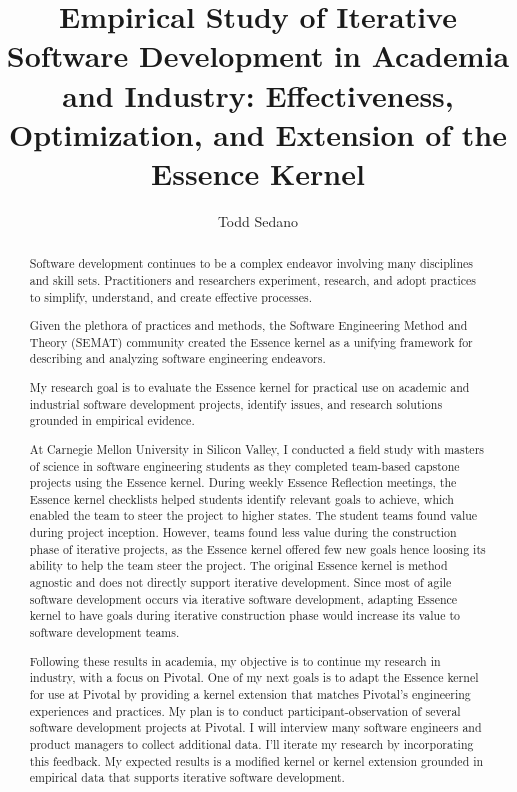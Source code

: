 \documentclass[preprint,12pt,3p]{elsarticle}
\begin{document}
\begin{frontmatter}

\title{Empirical Study of Iterative Software Development in Academia and Industry: Effectiveness, Optimization, and Extension of the Essence Kernel}

\author{Todd Sedano}


\address{Carnegie Mellon University}
\address{Silicon Valley Campus}
\address{Moffett Field, CA 94035, USA}


\begin{abstract}
Software development continues to be a complex endeavor involving many disciplines and skill sets. Practitioners and researchers experiment, research, and adopt practices to simplify, understand, and create effective processes. 

Given the plethora of practices and methods, the Software Engineering Method and Theory (SEMAT) community created the Essence kernel as a unifying framework for describing and analyzing software engineering endeavors. 

My research goal is to evaluate the Essence kernel for practical use on academic and industrial software development projects, identify issues, and research solutions grounded in empirical evidence. 

At Carnegie Mellon University in Silicon Valley, I conducted a field study with masters of science in software engineering students as they completed team-based capstone projects using the Essence kernel. During weekly Essence Reflection meetings, the Essence kernel checklists helped students identify relevant goals to achieve, which enabled the team to steer the project to higher states. The student teams found value during project inception. However, teams found less value during the construction phase of iterative projects, as the Essence kernel offered few new goals hence loosing its ability to help the team steer the project. The original Essence kernel is method agnostic and does not directly support iterative development. Since most of agile software development occurs via iterative software development, adapting Essence kernel to have goals during iterative construction phase would increase its value to software development teams.

Following these results in academia, my objective is to continue my research in industry, with a focus on Pivotal. One of my next goals is to adapt the Essence kernel for use at Pivotal by providing a kernel extension that matches Pivotal's engineering experiences and practices. My plan is to conduct participant-observation of several software development projects at Pivotal. I will interview many software engineers and product managers to collect additional data. I'll iterate my research by incorporating this feedback. My expected results is a modified kernel or kernel extension grounded in empirical data that supports iterative software development. 


\end{abstract}
\end{frontmatter}
\end{document}
